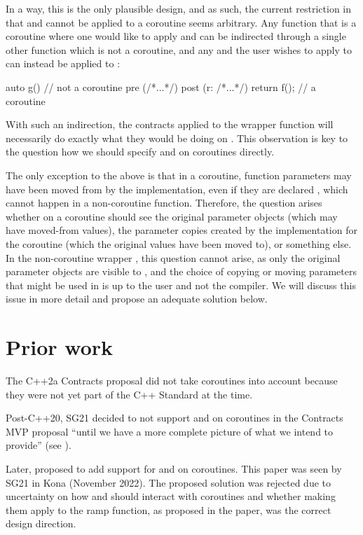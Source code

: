 In a way, this is the only plausible design, and as such, the current restriction in \cite{P2900R8} that  and  cannot be applied to a coroutine seems arbitrary. Any function  that is a coroutine where one would like to apply  and  can be indirected through a single other function  which is not a coroutine, and any  and  the user wishes to apply to  can instead be applied to :
\begin{codeblock}
auto g()  // not a coroutine
  pre (/*...*/) 
  post (r: /*...*/) 
{ 
  return f();  // a coroutine
} 
\end{codeblock}
With such an indirection, the contracts applied to the wrapper function  will necessarily do exactly what they would be doing on . This observation is key to the question how we should specify  and  on coroutines directly. 

The only exception to the above is that in a coroutine, function parameters may have been moved from by the implementation, even if they are declared , which cannot happen in a non-coroutine function. Therefore, the question arises whether  on a coroutine should see the original parameter objects (which may have moved-from values), the parameter copies created by the implementation for the coroutine (which the original values have been moved to), or something else. In the non-coroutine wrapper , this question cannot arise, as only the original parameter objects are visible to , and the choice of copying or moving parameters that might be used in  is up to the user and not the compiler. We will discuss this issue in more detail and propose an adequate solution below.

\section{Prior work}

The C++2a Contracts proposal \cite{P0542R5} did not take coroutines into account because they were not yet part of the C++ Standard at the time.

Post-C++20, SG21 decided to not support  and  on coroutines in the Contracts MVP proposal ``until we have a more complete picture of what we intend to provide'' (see \cite{P2932R3}).

Later, \cite{P2957R0} proposed to add support for  and  on coroutines. This paper was seen by SG21 in Kona (November 2022). The proposed solution was rejected due to uncertainty on how  and  should interact with coroutines and whether making them apply to the ramp function, as proposed in the paper, was the correct design direction.

